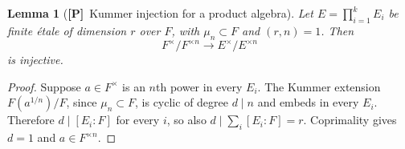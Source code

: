 \documentclass[11pt]{article}
\newcommand{\Ptag}{\textnormal{\textbf{[P]}}}
\theoremstyle{plain}
\newtheorem{lemma}[theorem]{Lemma}
\theoremstyle{definition}
\begin{document}
\begin{lemma}[\Ptag\ Kummer injection for a product algebra]\label{lem:Kumprod}
Let $E=\prod_{i=1}^kE_i$ be finite \emph{\'etale} of dimension $r$
over $F$, with $\mu_n\subset F$ and $(r,n)=1$.  Then
\begin{equation}\label{eq:Kummerinj}
 F^\times/F^{\times n}\longrightarrow
 E^\times/E^{\times n}
\end{equation}
is injective.
\end{lemma}
\begin{proof}
Suppose $a\in F^\times$ is an $n$th power in every $E_i$.
The Kummer extension $F(a^{1/n})/F$, since $\mu_n\subset F$,
is cyclic of degree $d\mid n$ and embeds in every $E_i$.
Therefore $d\mid[E_i:F]$ for every $i$, so also
$d\mid\sum_i[E_i:F]=r$.  Coprimality gives $d=1$ and
$a\in F^{\times n}$.
\end{proof}
\end{document}
